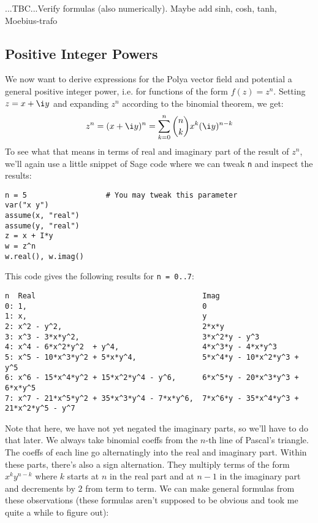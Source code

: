 \documentclass[12pt]{article}
\begin{document}
...TBC...Verify formulas (also numerically). Maybe add sinh, cosh, tanh, Moebius-trafo \newline

\subsection{Positive Integer Powers}
We now want to derive expressions for the Polya vector field and potential a general positive integer power, i.e. for functions of the form $f(z) = z^n$. Setting $z = x + \i y$ and expanding $z^n$ according to the binomial theorem, we get:
\begin{equation}
	z^n = (x + \i y)^n = \sum_{k=0}^n \binom{n}{k}  x^k (\i y)^{n-k}
\end{equation}
To see what that means in terms of real and imaginary part of the result of $z^n$, we'll again use a little snippet of Sage code where we can tweak \texttt{n} and inspect the results:
\begin{verbatim}
n = 5	               # You may tweak this parameter
var("x y")
assume(x, "real")
assume(y, "real")
z = x + I*y
w = z^n
w.real(), w.imag()
\end{verbatim}
This code gives the following results for \texttt{n = 0..7}:
\begin{verbatim}
n  Real                                      Imag
0: 1,                                        0 
1: x,                                        y
2: x^2 - y^2,                                2*x*y
3: x^3 - 3*x*y^2,                            3*x^2*y - y^3
4: x^4 - 6*x^2*y^2  + y^4,                   4*x^3*y - 4*x*y^3
5: x^5 - 10*x^3*y^2 + 5*x*y^4,               5*x^4*y - 10*x^2*y^3 + y^5
6: x^6 - 15*x^4*y^2 + 15*x^2*y^4 - y^6,      6*x^5*y - 20*x^3*y^3 + 6*x*y^5
7: x^7 - 21*x^5*y^2 + 35*x^3*y^4 - 7*x*y^6,  7*x^6*y - 35*x^4*y^3 + 21*x^2*y^5 - y^7
\end{verbatim}
Note that here, we have not yet negated the imaginary parts, so we'll have to do that later. We always take binomial coeffs from the $n$-th line of Pascal's triangle. The coeffs of each line go alternatingly into the real and imaginary part. Within these parts, there's also a sign alternation. They multiply terms of the form $x^k y^{n-k}$ where $k$ starts at $n$ in the real part and at $n-1$ in the imaginary part and decrements by $2$ from term to term. We can make general formulas from these observations (these formulas aren't supposed to be obvious and took me quite a while to figure out):
\end{document}
